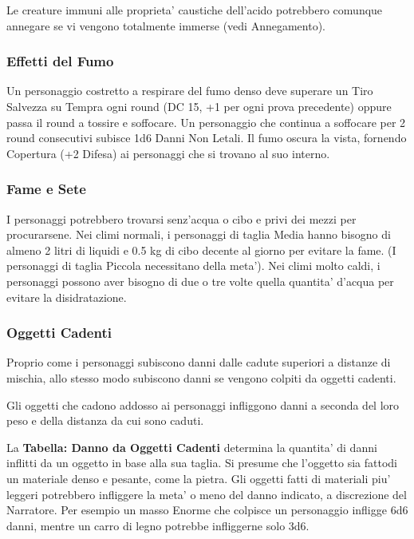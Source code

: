 \documentclass[a4paper,11pt,twoside,openany]{book}
\begin{document}
{Le creature immuni alle proprieta' caustiche dell'acido potrebbero comunque annegare se vi vengono totalmente immerse (vedi Annegamento).

\subsubsection{Effetti del Fumo}

\label{effetti-del-fumo}

Un personaggio costretto a respirare del fumo denso deve superare un Tiro Salvezza su Tempra ogni round (DC 15, +1 per ogni prova precedente) oppure passa il round a tossire e soffocare. Un personaggio che continua a soffocare per 2 round consecutivi subisce 1d6 Danni Non Letali. Il fumo oscura la vista, fornendo Copertura (+2 Difesa) ai personaggi che si trovano al suo interno.

\subsubsection{Fame e Sete}

\label{fame-e-sete}

I personaggi potrebbero trovarsi senz'acqua o cibo e privi dei mezzi per procurarsene. Nei climi normali, i personaggi di taglia Media hanno bisogno di almeno 2 litri di liquidi e 0.5 kg di cibo decente al giorno per evitare la fame. (I personaggi di taglia Piccola necessitano della meta'). Nei climi molto caldi, i personaggi possono aver bisogno di due o tre volte quella quantita' d'acqua per evitare la disidratazione.

\subsubsection{Oggetti Cadenti}

\label{oggetti-cadenti}

Proprio come i personaggi subiscono danni dalle cadute superiori a distanze di mischia, allo stesso modo subiscono danni se vengono colpiti da oggetti cadenti.

Gli oggetti che cadono addosso ai personaggi infliggono danni a seconda del loro peso e della distanza da cui sono caduti.

La \textbf{Tabella: Danno da Oggetti Cadenti} determina la quantita' di danni inflitti da un oggetto in base alla sua taglia. Si presume che l'oggetto sia fattodi un materiale denso e pesante, come la pietra. 
Gli oggetti fatti di materiali piu' leggeri potrebbero infliggere la meta' o meno del danno indicato, a discrezione del Narratore. Per esempio un masso Enorme che colpisce un personaggio infligge 6d6 danni, mentre un carro di legno potrebbe infliggerne solo 3d6.

}
\end{document}
